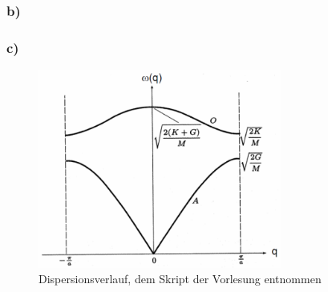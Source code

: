 \documentclass[11pt]{article}
\begin{document}
\subsubsection*{b)}

\subsubsection*{c)}
\begin{figure}
  \centering
  \includegraphics[width=8cm]{blatt04-9c.png}
\caption{Dispersionsverlauf, dem Skript der Vorlesung entnommen}
\end{figure}
\end{document}
